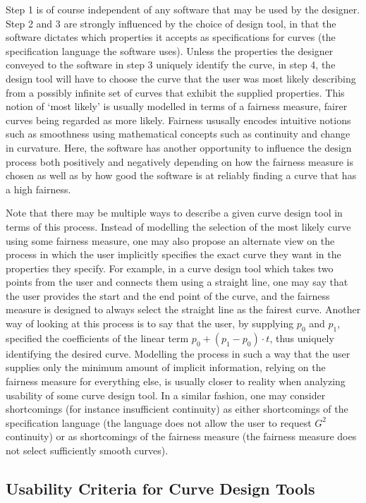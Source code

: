 \documentclass[a4paper]{article}
\begin{document}
			Step 1 is of course independent of any software that may be used by the designer. Step 2 and 3 are strongly influenced by the choice of design tool, in that the software dictates which properties it accepts as specifications for curves (the specification language the software uses). Unless the properties the designer conveyed to the software in step 3 uniquely identify the curve, in step 4, the design tool will have to choose the curve that the user was most likely describing from a possibly infinite set of curves that exhibit the supplied properties. This notion of `most likely' is usually modelled in terms of a fairness measure, fairer curves being regarded as more likely. Fairness ususally encodes intuitive notions such as smoothness using mathematical concepts such as continuity and change in curvature. Here, the software has another opportunity to influence the design process both positively and negatively depending on how the fairness measure is chosen as well as by how good the software is at reliably finding a curve that has a high fairness.

			Note that there may be multiple ways to describe a given curve design tool in terms of this process. Instead of modelling the selection of the most likely curve using some fairness measure, one may also propose an alternate view on the process in which the user implicitly specifies the exact curve they want in the properties they specify. For example, in a curve design tool which takes two points from the user and connects them using a straight line, one may say that the user provides the start and the end point of the curve, and the fairness measure is designed to always select the straight line as the fairest curve. Another way of looking at this process is to say that the user, by supplying \(p_0\) and \(p_1\), specified the coefficients of the linear term \(p_0 + \left(p_1 - p_0\right) \cdot t\), thus uniquely identifying the desired curve. Modelling the process in such a way that the user supplies only the minimum amount of implicit information, relying on the fairness measure for everything else, is usually closer to reality when analyzing usability of some curve design tool. In a similar fashion, one may consider shortcomings (for instance insufficient continuity) as either shortcomings of the specification language (the language does not allow the user to request \(G^2\) continuity) or as shortcomings of the fairness measure (the fairness measure does not select sufficiently smooth curves).

		\subsection{Usability Criteria for Curve Design Tools}
		\label{section:usability_criteria_curve_design_tools}
\end{document}
